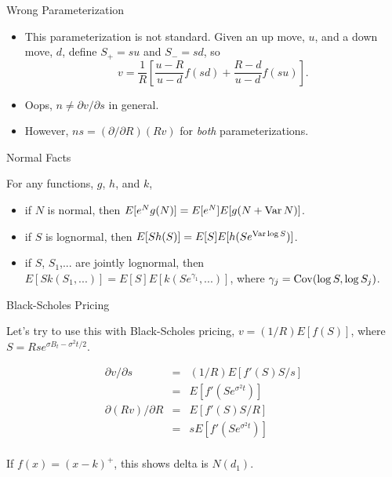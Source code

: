 \documentclass[fleqn]{amsart}
\def\Var{\mathop{\rm Var}}
\def\Cov{\mathop{\rm Cov}}
\begin{document}
\begin{section}{Wrong Parameterization}

\begin{itemize}

\item This parameterization is not standard. Given an up move, $u$,
and a down move, $d$, define $S_+ = su$ and $S_- = sd$, so
$$
	v = \frac{1}{R}\left[\frac{u - R}{u - d} f(sd)
		+ \frac{R - d}{u - d} f(su)\right].
$$

\item Oops, $n \not= \partial v/\partial s$ in general.

\item However, $ns = (\partial/\partial R)(Rv)$ for {\em both}
parameterizations.

\end{itemize}

\end{section}

\begin{section}{Normal Facts}

For any functions, $g$, $h$, and $k$,

\begin{itemize}

\item if $N$ is normal, then $E[e^N g(N)] = E[e^N] E[g(N + \Var N)]$.

\item if $S$ is lognormal, then $E[S h(S)] = E[S] E[h(Se^{\Var\log S})]$.

\item if $S$, $S_1$,... are jointly lognormal, then
$E[S k(S_1,...)] = E[S] E[k(Se^{\gamma_1},...)]$, where
$\gamma_j = \Cov(\log S, \log S_j)$.

\end{itemize}

\end{section}


\begin{section}{Black-Scholes Pricing}

Let's try to use this with Black-Scholes pricing, $v = (1/R) E[f(S)]$,
where $S = Rse^{\sigma B_t - \sigma^2 t/2}$.

\begin{eqnarray*}
\partial v/\partial s &=& (1/R) E[f'(S) S/s]\\
	&=& E[f'(Se^{\sigma^2 t})]\\
\partial(Rv)/\partial R &=& E[f'(S) S/R]\\
	&=& s E[f'(Se^{\sigma^2 t})]\\
\end{eqnarray*}

If $f(x) = (x - k)^+$, this shows delta is $N(d_1)$.

\end{section}
\end{document}
